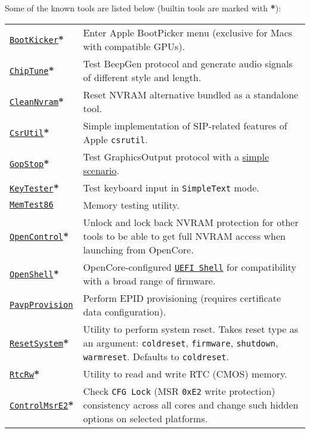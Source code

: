 \documentclass[]{article}
\begin{document}
Some of the known tools are listed below (builtin tools are marked with \textbf{*}):

\begin{tabular}{p{1.3in}p{5.55in}}
\href{https://github.com/acidanthera/OpenCorePkg}{\texttt{BootKicker}}\textbf{*}
& Enter Apple BootPicker menu (exclusive for Macs with compatible GPUs). \\
\href{https://github.com/acidanthera/OpenCorePkg}{\texttt{ChipTune}}\textbf{*}
& Test BeepGen protocol and generate audio signals of different style and length. \\
\href{https://github.com/acidanthera/OpenCorePkg}{\texttt{CleanNvram}}\textbf{*}
& Reset NVRAM alternative bundled as a standalone tool. \\
\href{https://github.com/acidanthera/OpenCorePkg}{\texttt{CsrUtil}}\textbf{*}
& Simple implementation of SIP-related features of Apple \texttt{csrutil}. \\
\href{https://github.com/acidanthera/OpenCorePkg}{\texttt{GopStop}}\textbf{*}
& Test GraphicsOutput protocol with a
  \href{https://github.com/acidanthera/OpenCorePkg/tree/master/Application/GopStop}{simple scenario}. \\
\href{https://github.com/acidanthera/OpenCorePkg}{\texttt{KeyTester}}\textbf{*}
& Test keyboard input in \texttt{SimpleText} mode. \\
\href{https://www.memtest86.com}{\texttt{MemTest86}}
& Memory testing utility. \\
\href{https://github.com/acidanthera/OpenCorePkg}{\texttt{OpenControl}}\textbf{*}
& Unlock and lock back NVRAM protection for other tools to be able to get full NVRAM access
  when launching from OpenCore. \\
\href{https://github.com/acidanthera/OpenCorePkg}{\texttt{OpenShell}}\textbf{*}
& OpenCore-configured \href{http://github.com/tianocore/edk2}{\texttt{UEFI Shell}} for compatibility
  with a broad range of firmware. \\
\href{https://github.com/acidanthera/OpenCorePkg}{\texttt{PavpProvision}}
& Perform EPID provisioning (requires certificate data configuration). \\
\href{https://github.com/acidanthera/OpenCorePkg}{\texttt{ResetSystem}}\textbf{*}
& Utility to perform system reset. Takes reset type as an argument:
  \texttt{coldreset}, \texttt{firmware}, \texttt{shutdown}, \texttt{warmreset}.
  Defaults to \texttt{coldreset}. \\
\href{https://github.com/acidanthera/OpenCorePkg}{\texttt{RtcRw}}\textbf{*}
& Utility to read and write RTC (CMOS) memory. \\
\href{https://github.com/acidanthera/OpenCorePkg}{\texttt{ControlMsrE2}}\textbf{*}
& Check \texttt{CFG Lock} (MSR \texttt{0xE2} write protection) consistency
across all cores and change such hidden options on selected platforms.
\end{tabular}
\end{document}
